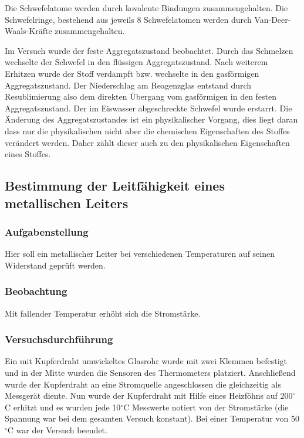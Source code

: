 \documentclass{scrartcl}
\begin{document}
Die Schwefelatome werden durch kovalente Bindungen zusammengehalten. Die Schwefelringe, bestehend aus jeweils 8 Schwefelatomen werden durch Van-Deer-Waals-Kräfte zusammengehalten. 

Im Versuch wurde der feste Aggregatszustand beobachtet. Durch das Schmelzen wechselte der Schwefel in den flüssigen Aggregatszustand. Nach weiterem Erhitzen wurde der Stoff verdampft bzw. wechselte in den gasförmigen Aggregatszustand.
Der Niederschlag am Reagenzglas entstand durch Resublimierung also dem direkten Übergang vom gasförmigen in den festen Aggregatszustand. Der im Eiswasser abgeschreckte Schwefel wurde erstarrt.
Die Änderung des Aggregatszustandes ist ein physikalischer Vorgang, dies liegt daran dass nur die physikalischen nicht aber die chemischen Eigenschaften des Stoffes verändert werden. Daher zählt dieser auch zu den physikalischen Eigenschaften eines Stoffes.
 
\subsection{Bestimmung der Leitfähigkeit eines metallischen Leiters}
\subsubsection{Aufgabenstellung}
Hier soll ein metallischer Leiter bei verschiedenen Temperaturen auf seinen Widerstand geprüft werden.
\subsubsection{Beobachtung}
Mit fallender Temperatur erhöht sich die Stromstärke.
\subsubsection{Versuchsdurchführung}
Ein mit Kupferdraht umwickeltes Glasrohr wurde mit zwei Klemmen befestigt und in der Mitte wurden die Sensoren des Thermometers platziert. Anschließend wurde der Kupferdraht an eine Stromquelle angeschlossen die gleichzeitig als Messgerät diente. Nun wurde der Kupferdraht mit Hilfe eines Heizföhns auf 200$^\circ$C erhitzt und es wurden jede 10$^\circ$C Messwerte notiert von der Stromstärke (die Spannung war bei dem gesamten Versuch konstant). Bei einer Temperatur von 50$^\circ$C war der Versuch beendet. 
\end{document}
